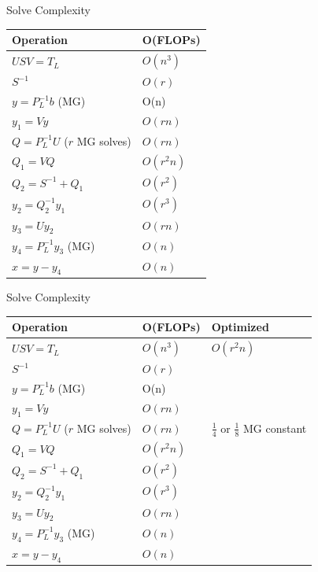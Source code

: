 \documentclass[xcolor=dvipsnames,10pt]{beamer}
\begin{document}
\begin{frame}{Solve Complexity}
\begin{center}
\renewcommand{\arraystretch}{1.5}
    \begin{tabular}{ | l | l |}
    \hline
    \textbf{Operation} & \textbf{O(FLOPs)} \\ \hline
    $USV = T_L$ & $O(n^3)$ \\ \hline
    $S^{-1}$ & $O(r)$ \\ \hline
    $y = P_L^{-1}b$ (MG) & O(n)  \\  \hline
    $y_1 = Vy$ & $O(rn)$ \\ \hline
    $Q = P_L^{-1}U$ ($r$ MG solves) & $O(rn)$ \\ \hline
    $Q_1 = VQ$ & $O(r^2 n)$ \\ \hline
    $Q_2 = S^{-1} + Q_1$ & $O(r^2)$ \\ \hline
    $y_2 = Q_2^{-1}y_1$ & $O(r^3)$ \\ \hline
    $y_3 = Uy_2$ & $O(rn)$ \\ \hline
    $y_4 = P_L^{-1}y_3$ (MG) & $O(n)$ \\ \hline
    $x = y - y_4$ & $O(n)$ \\
    \hline
    \end{tabular}
\end{center}
\end{frame}

\begin{frame}{Solve Complexity}
\begin{center}
\renewcommand{\arraystretch}{1.5}
    \begin{tabular}{ | l | l | l |}
    \hline
    \textbf{Operation} & \textbf{O(FLOPs)} & \textbf{Optimized} \\ \hline
    $USV = T_L$ & $O(n^3)$ & $O(r^{2}n)$\\ \hline
    $S^{-1}$ & $O(r)$ \\ \hline
    $y = P_L^{-1}b$ (MG) & O(n)  \\  \hline
    $y_1 = Vy$ & $O(rn)$ \\ \hline
    $Q = P_L^{-1}U$ ($r$ MG solves) & $O(rn)$ & $\frac{1}{4}$ or $\frac{1}{8}$ MG constant\\ \hline
    $Q_1 = VQ$ & $O(r^2 n)$ \\ \hline
    $Q_2 = S^{-1} + Q_1$ & $O(r^2)$ \\ \hline
    $y_2 = Q_2^{-1}y_1$ & $O(r^3)$ \\ \hline
    $y_3 = Uy_2$ & $O(rn)$ \\ \hline
    $y_4 = P_L^{-1}y_3$ (MG) & $O(n)$ \\ \hline
    $x = y - y_4$ & $O(n)$ \\
    \hline
    \end{tabular}
\end{center}
\end{frame}
\end{document}
